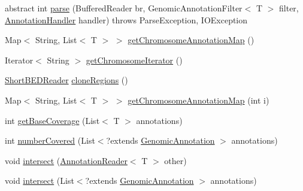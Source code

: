 \begin{DoxyCompactItemize}
\item 
abstract int \hyperlink{classbroad_1_1core_1_1annotation_1_1_annotation_reader_3_01_t_01extends_01_genomic_annotation_01_4_a50981d0875a2b950aa529e789635ea59}{parse} (Buffered\+Reader br, Genomic\+Annotation\+Filter$<$ T $>$ filter, \hyperlink{interfacebroad_1_1core_1_1annotation_1_1_annotation_handler}{Annotation\+Handler} handler)  throws Parse\+Exception, I\+O\+Exception
\item 
Map$<$ String, List$<$ T $>$ $>$ \hyperlink{classbroad_1_1core_1_1annotation_1_1_annotation_reader_3_01_t_01extends_01_genomic_annotation_01_4_a643eb0fb496db61f15a334d67e3f8bc8}{get\+Chromosome\+Annotation\+Map} ()
\item 
Iterator$<$ String $>$ \hyperlink{classbroad_1_1core_1_1annotation_1_1_annotation_reader_3_01_t_01extends_01_genomic_annotation_01_4_a939e2df3892ffc1a1a2c0684e3a21875}{get\+Chromosome\+Iterator} ()
\item 
\hyperlink{classbroad_1_1core_1_1annotation_1_1_short_b_e_d_reader}{Short\+B\+E\+D\+Reader} \hyperlink{classbroad_1_1core_1_1annotation_1_1_annotation_reader_3_01_t_01extends_01_genomic_annotation_01_4_aafba9e3874d96126b9001f8ff9d815a2}{clone\+Regions} ()
\item 
Map$<$ String, List$<$ T $>$ $>$ \hyperlink{classbroad_1_1core_1_1annotation_1_1_annotation_reader_3_01_t_01extends_01_genomic_annotation_01_4_a7e144ef5d1e8ab9f2940cda45f5d3a09}{get\+Chromosome\+Annotation\+Map} (int i)
\item 
int \hyperlink{classbroad_1_1core_1_1annotation_1_1_annotation_reader_3_01_t_01extends_01_genomic_annotation_01_4_a3f3fec809e8eaacb1a90cc0895197ee4}{get\+Base\+Coverage} (List$<$ T $>$ annotations)
\item 
int \hyperlink{classbroad_1_1core_1_1annotation_1_1_annotation_reader_3_01_t_01extends_01_genomic_annotation_01_4_a740b107b5b81c15a5f86eada1fb2ba4a}{number\+Covered} (List$<$?extends \hyperlink{interfacebroad_1_1core_1_1annotation_1_1_genomic_annotation}{Genomic\+Annotation} $>$ annotations)
\item 
void \hyperlink{classbroad_1_1core_1_1annotation_1_1_annotation_reader_3_01_t_01extends_01_genomic_annotation_01_4_ad348dc8271285cf288c0ea538199c423}{intersect} (\hyperlink{classbroad_1_1core_1_1annotation_1_1_annotation_reader_3_01_t_01extends_01_genomic_annotation_01_4_adc7b77cf9681958941014c7b460dbb9f}{Annotation\+Reader}$<$ T $>$ other)
\item 
void \hyperlink{classbroad_1_1core_1_1annotation_1_1_annotation_reader_3_01_t_01extends_01_genomic_annotation_01_4_ab76576c64303826be4887cc1c34e4252}{intersect} (List$<$?extends \hyperlink{interfacebroad_1_1core_1_1annotation_1_1_genomic_annotation}{Genomic\+Annotation} $>$ annotations)

\end{DoxyCompactItemize}
